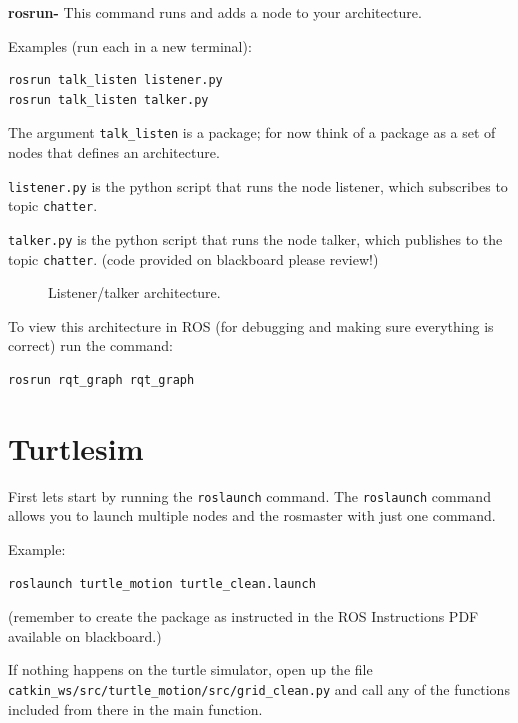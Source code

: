 \documentclass[11pt]{article}
\begin{document}
\textbf{rosrun-} This command runs and adds a node to your architecture.

Examples (run each in a new terminal):
\begin{lstlisting}[language=bash,numbers=none]
rosrun talk_listen listener.py
rosrun talk_listen talker.py
\end{lstlisting}

The argument \texttt{talk\_listen} is a package; for now think of a package as a set of nodes that defines an architecture.

\texttt{listener.py} is the python script that runs the node listener, which subscribes to topic \texttt{chatter}.

\texttt{talker.py} is the python script that runs the node talker, which publishes to the topic \texttt{chatter}. (code provided on blackboard please review!)

\begin{figure}[ht]
\centering
{}
\caption{Listener/talker architecture.}
\end{figure}

To view this architecture in ROS (for debugging and making sure everything is correct) run the command:
\begin{lstlisting}[language=bash,numbers=none]
rosrun rqt_graph rqt_graph
\end{lstlisting}

\section{Turtlesim}
First lets start by running the \texttt{roslaunch} command. The \texttt{roslaunch} command allows you to launch multiple nodes and the rosmaster with just one command.

Example:
\begin{lstlisting}[language=bash,numbers=none]
roslaunch turtle_motion turtle_clean.launch
\end{lstlisting}

(remember to create the package as instructed in the ROS Instructions PDF available on blackboard.)

If nothing happens on the turtle simulator, open up the file \texttt{catkin\_ws/src/turtle\_motion/src/grid\_clean.py} and call any of the functions included from there in the main function.
\end{document}
